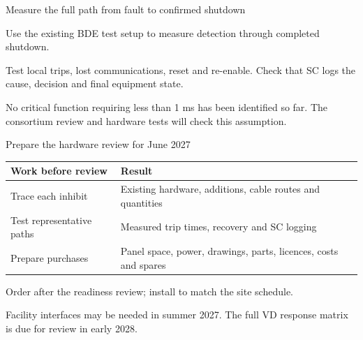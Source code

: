 \documentclass[aspectratio=169,11pt]{beamer}
\begin{document}
\begin{frame}{Measure the full path from fault to confirmed shutdown}
\centering
{}\par\smallskip
\raggedright{}\par\smallskip
\raggedright

Use the existing BDE test setup to measure detection through completed shutdown.\par\medskip
Test local trips, lost communications, reset and re-enable. Check that SC logs the cause, decision and final equipment state.\par\bigskip
No critical function requiring less than 1 ms has been identified so far. The consortium review and hardware tests will check this assumption.
\end{frame}

\DpsMilestones

\begin{frame}{Prepare the hardware review for June 2027}
\renewcommand{\arraystretch}{1.45}
\begin{tabularx}{\textwidth}{@{}>{\RaggedRight\arraybackslash}p{3.4cm}>{\RaggedRight\arraybackslash}X@{}}
\toprule
\textbf{Work before review} & \textbf{Result}\\\midrule
Trace each inhibit & Existing hardware, additions, cable routes and quantities\\
Test representative paths & Measured trip times, recovery and SC logging\\
Prepare purchases & Panel space, power, drawings, parts, licences, costs and spares\\
\bottomrule
\end{tabularx}\par\bigskip
Order after the readiness review; install to match the site schedule.\par\medskip
Facility interfaces may be needed in summer 2027. The full VD response matrix is due for review in early 2028.
\end{frame}
\end{document}
